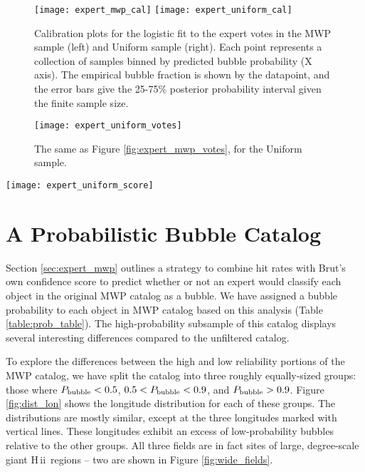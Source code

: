 \documentclass[preprint]{aastex}
\newcommand{\hii}[0]{{\sc H\,ii}}
\begin{document}
\begin{figure}[h!]
\label{fig:calibration}
\texttt{[image: expert\_mwp\_cal]}
\texttt{[image: expert\_uniform\_cal]}
\caption{Calibration plots for the logistic fit to the expert votes in the MWP sample (left) and Uniform sample (right). Each point represents a collection of samples binned by predicted bubble probability (X axis). The empirical bubble fraction is shown by the
datapoint, and the error bars give the 25-75\% posterior probability interval given the finite sample size.}
\end{figure}

\begin{figure}[h!]
\texttt{[image: expert\_uniform\_votes]}
\caption{The same as Figure \ref{fig:expert_mwp_votes}, for the Uniform sample.}
\label{fig:expert_uniform_votes}
\end{figure}

\begin{figure*}
\texttt{[image: expert\_uniform\_score]}
\caption{The same as Figure \ref{fig:expert_uniform_score}, for the Uniform sample.}
\label{fig:expert_uniform_score}
\end{figure*}

\section{A Probabilistic Bubble Catalog}
\label{sec:prob}
Section \ref{sec:expert_mwp} outlines a strategy to combine hit rates with Brut's own confidence score to predict whether or not
an expert would classify each object in the original MWP catalog as a bubble. We have assigned a bubble probability to each
object in MWP catalog based on this analysis (Table \ref{table:prob_table}). The high-probability subsample of this catalog displays several interesting differences compared to the unfiltered catalog. 

To explore the differences between the high and low reliability portions of the MWP catalog, we have split the catalog into three roughly equally-sized groups: those where $P_{\rm bubble} < 0.5$, $0.5 < P_{\rm bubble} < 0.9$,
and $P_{\rm bubble} > 0.9$. Figure \ref{fig:dist_lon} shows the longitude distribution for each of these groups. The distributions are mostly similar, except at the three longitudes marked with vertical lines. These longitudes exhibit an excess of low-probability bubbles relative to the other groups.  All three fields are in fact sites of large, degree-scale giant \hii\, regions -- two are shown in Figure \ref{fig:wide_fields}. 
\end{document}
